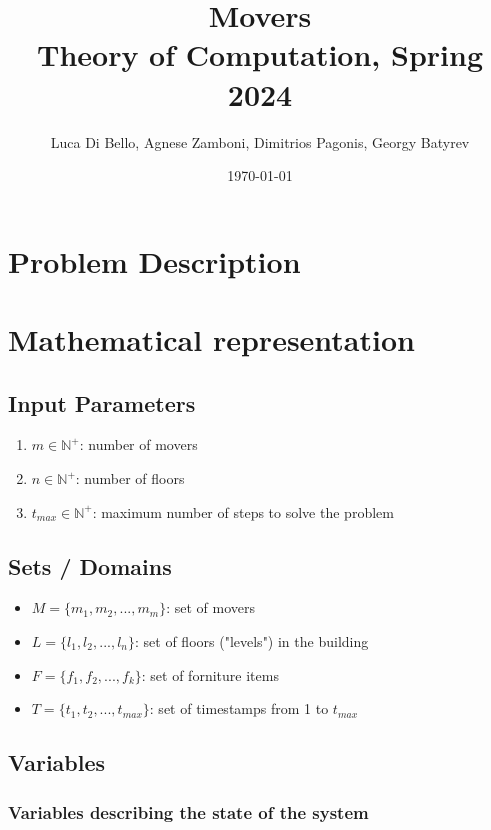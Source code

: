 \documentclass[a4paper, 11pt]{article}
\title{Movers \\[1ex] \large Theory of Computation, Spring 2024}
\author{Luca Di Bello, Agnese Zamboni, Dimitrios Pagonis, Georgy Batyrev}
\date{\today}
\begin{document}
\maketitle
\tableofcontents

\section{Problem Description}

\pagebreak

\section{Mathematical representation}

\subsection{Input Parameters}

\begin{enumerate}
    \item $m \in \mathbb{N}^+$: number of movers
     \item $n \in \mathbb{N}^+$: number of floors
      \item $t_{max} \in \mathbb{N}^+$: maximum number of steps to solve the problem
\end{enumerate}

\subsection{Sets / Domains}

\begin{itemize}
    \item $M = \{m_1, m_2, ..., m_m\}$: set of movers
    \item $L = \{l_1, l_2, ..., l_n\}$: set of floors ("levels") in the building
    \item $F = \{f_1, f_2, ..., f_k\}$: set of forniture items
    \item $T = \{t_1, t_2, ..., t_{max}\}$: set of timestamps from 1 to $t_{max}$
\end{itemize}


\subsection{Variables}

\subsubsection{Variables describing the state of the system}
\end{document}
